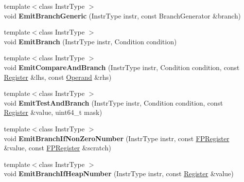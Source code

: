\begin{DoxyCompactItemize}
\item 
{\footnotesize template$<$class Instr\+Type $>$ }\\void {\bfseries Emit\+Branch\+Generic} (Instr\+Type instr, const Branch\+Generator \&branch)\hypertarget{classv8_1_1internal_1_1_l_code_gen_a781ad29b86d5069af9d763f969941a81}{}\label{classv8_1_1internal_1_1_l_code_gen_a781ad29b86d5069af9d763f969941a81}

\item 
{\footnotesize template$<$class Instr\+Type $>$ }\\void {\bfseries Emit\+Branch} (Instr\+Type instr, Condition condition)\hypertarget{classv8_1_1internal_1_1_l_code_gen_af34ca2c4fbc9ddc61b5d7c6c46695b07}{}\label{classv8_1_1internal_1_1_l_code_gen_af34ca2c4fbc9ddc61b5d7c6c46695b07}

\item 
{\footnotesize template$<$class Instr\+Type $>$ }\\void {\bfseries Emit\+Compare\+And\+Branch} (Instr\+Type instr, Condition condition, const \hyperlink{structv8_1_1internal_1_1_register}{Register} \&lhs, const \hyperlink{classv8_1_1internal_1_1_operand}{Operand} \&rhs)\hypertarget{classv8_1_1internal_1_1_l_code_gen_a26a4c66c685bf08d09643afb388836a0}{}\label{classv8_1_1internal_1_1_l_code_gen_a26a4c66c685bf08d09643afb388836a0}

\item 
{\footnotesize template$<$class Instr\+Type $>$ }\\void {\bfseries Emit\+Test\+And\+Branch} (Instr\+Type instr, Condition condition, const \hyperlink{structv8_1_1internal_1_1_register}{Register} \&value, uint64\+\_\+t mask)\hypertarget{classv8_1_1internal_1_1_l_code_gen_aaa581ed19a619a10daa87622ab1fd604}{}\label{classv8_1_1internal_1_1_l_code_gen_aaa581ed19a619a10daa87622ab1fd604}

\item 
{\footnotesize template$<$class Instr\+Type $>$ }\\void {\bfseries Emit\+Branch\+If\+Non\+Zero\+Number} (Instr\+Type instr, const \hyperlink{structv8_1_1internal_1_1_f_p_register}{F\+P\+Register} \&value, const \hyperlink{structv8_1_1internal_1_1_f_p_register}{F\+P\+Register} \&scratch)\hypertarget{classv8_1_1internal_1_1_l_code_gen_a84d5c02491fef44cfcbaa7270aeb0192}{}\label{classv8_1_1internal_1_1_l_code_gen_a84d5c02491fef44cfcbaa7270aeb0192}

\item 
{\footnotesize template$<$class Instr\+Type $>$ }\\void {\bfseries Emit\+Branch\+If\+Heap\+Number} (Instr\+Type instr, const \hyperlink{structv8_1_1internal_1_1_register}{Register} \&value)\hypertarget{classv8_1_1internal_1_1_l_code_gen_accde45ca31e3c5470592d17a1efe7a32}{}\label{classv8_1_1internal_1_1_l_code_gen_accde45ca31e3c5470592d17a1efe7a32}


\end{DoxyCompactItemize}
